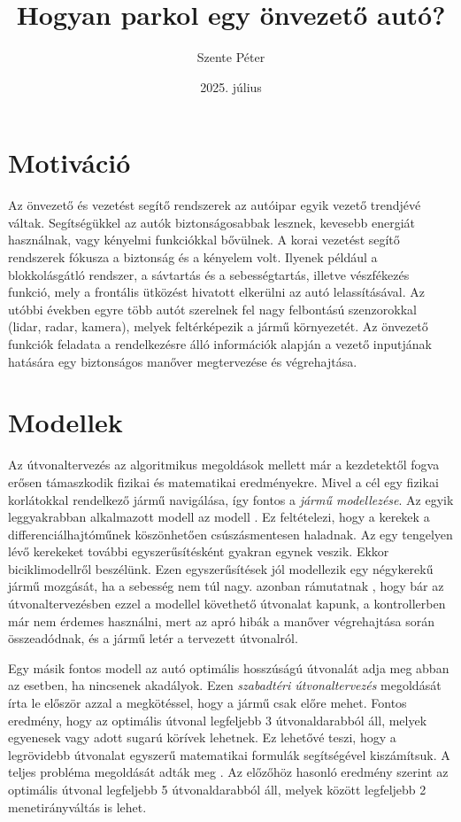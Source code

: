 \documentclass{article}
\title{Hogyan parkol egy önvezető autó?}
\author{Szente Péter}
\date{2025. július}
\begin{document}
\maketitle

\section{Motiváció}
Az önvezető és vezetést segítő rendszerek az autóipar egyik vezető trendjévé váltak. Segítségükkel az autók biztonságosabbak lesznek, kevesebb energiát használnak, vagy kényelmi funkciókkal bővülnek. A korai vezetést segítő rendszerek fókusza a biztonság és a kényelem volt. Ilyenek például a blokkolásgátló rendszer, a sávtartás és a sebességtartás, illetve vészfékezés funkció, mely a frontális ütközést hivatott elkerülni az autó lelassításával. Az utóbbi években egyre több autót szerelnek fel nagy felbontású szenzorokkal (lidar, radar, kamera), melyek feltérképezik a jármű környezetét. Az önvezető funkciók feladata a rendelkezésre álló információk alapján a vezető inputjának hatására egy biztonságos manőver megtervezése és végrehajtása.


\section{Modellek}

Az útvonaltervezés az algoritmikus megoldások mellett már a kezdetektől fogva erősen támaszkodik fizikai és matematikai eredményekre. Mivel a cél egy fizikai korlátokkal rendelkező jármű navigálása, így fontos a \textit{jármű modellezése}. Az egyik leggyakrabban alkalmazott modell az \citeauthor{ackermann1990robust} modell \cite{ackermann1990robust}. Ez feltételezi, hogy a kerekek a differenciálhajtóműnek köszönhetően csúszásmentesen haladnak. Az egy tengelyen lévő kerekeket további egyszerűsítésként gyakran egynek veszik. Ekkor biciklimodellről \cite{polack2017kinematicBicycleModel} beszélünk. Ezen egyszerűsítések jól modellezik egy négykerekű jármű mozgását, ha a sebesség nem túl nagy. \citeauthor{polack2017kinematicBicycleModel} azonban rámutatnak \cite{polack2017kinematicBicycleModel}, hogy bár az útvonaltervezésben ezzel a modellel követhető útvonalat kapunk, a kontrollerben már nem érdemes használni, mert az apró hibák a manőver végrehajtása során összeadódnak, és a jármű letér a tervezett útvonalról.

Egy másik fontos modell az autó optimális hosszúságú útvonalát adja meg abban az esetben, ha nincsenek akadályok. Ezen \textit{szabadtéri útvonaltervezés} megoldását \citeauthor{dubins1957curves} írta le először \cite{dubins1957curves} azzal a megkötéssel, hogy a jármű csak előre mehet. Fontos eredmény, hogy az optimális útvonal legfeljebb 3 útvonaldarabból áll, melyek egyenesek vagy adott sugarú körívek lehetnek. Ez lehetővé teszi, hogy a legrövidebb útvonalat egyszerű matematikai formulák segítségével kiszámítsuk. A teljes probléma megoldását \citeauthor{reeds1990optimal} adták meg \cite{reeds1990optimal}. Az előzőhöz hasonló eredmény szerint az optimális útvonal legfeljebb 5 útvonaldarabból áll, melyek között legfeljebb 2 menetirányváltás is lehet.
\end{document}
